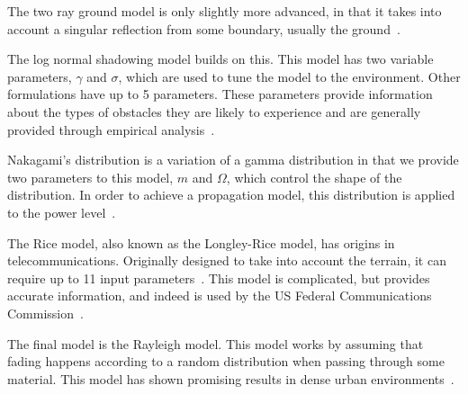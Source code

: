     The two ray ground model is only slightly more advanced, in that it takes into account a singular reflection from some boundary, usually the ground~\cite{tworaygroundmodel}.

    The log normal shadowing model builds on this. This model has two variable parameters, $\gamma$ and $\sigma$, which are used to tune the model to the environment. Other formulations have up to 5 parameters. These parameters provide information about the types of obstacles they are likely to experience and are generally provided through empirical analysis~\cite{goldhirsh1998handbook}.

    Nakagami's distribution is a variation of a gamma distribution in that we provide two parameters to this model, $m$ and $\Omega$, which control the shape of the distribution. In order to achieve a propagation model, this distribution is applied to the power level~\cite{nakagamipowerlevel}.

    The Rice model, also known as the Longley-Rice model, has origins in telecommunications. Originally designed to take into account the terrain, it can require up to 11 input parameters~\cite{ricemodel}. This model is complicated, but provides accurate information, and indeed is used by the US Federal Communications Commission~\cite{fcclongleyrice}.

    The final model is the Rayleigh model. This model works by assuming that fading happens according to a random distribution when passing through some material. This model has shown promising results in dense urban environments~\cite{rayleighmanhattan}.



